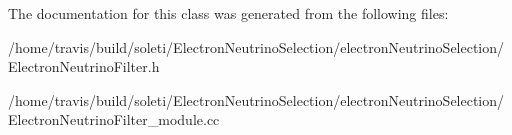The documentation for this class was generated from the following files\-:\begin{DoxyCompactItemize}
\item 
/home/travis/build/soleti/\-Electron\-Neutrino\-Selection/electron\-Neutrino\-Selection/Electron\-Neutrino\-Filter.\-h\item 
/home/travis/build/soleti/\-Electron\-Neutrino\-Selection/electron\-Neutrino\-Selection/Electron\-Neutrino\-Filter\-\_\-module.\-cc\end{DoxyCompactItemize}

